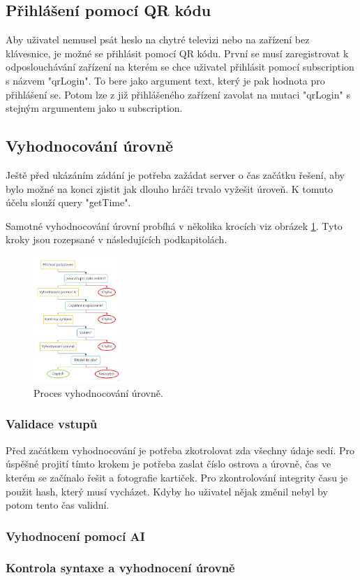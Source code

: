 \subsection{Přihlášení pomocí QR kódu}
Aby uživatel nemusel psát heslo na chytré televizi nebo na zařízení bez klávesnice, je možné se přihlásit pomocí QR kódu. První se musí zaregistrovat k odposlouchávání zařízení na kterém se chce uživatel přihlásit pomocí subscription s názvem "qrLogin". To bere jako argument text, který je pak hodnota pro přihlášení se. Potom lze z již přihlášeného zařízení zavolat na mutaci "qrLogin" s stejným argumentem jako u subscription.

\subsection{Vyhodnocování úrovně}
Ještě před ukázáním zádání je potřeba zažádat server o čas začátku řešení, aby bylo možné na konci zjistit jak dlouho hráči trvalo vyžešit úroveň. K tomuto účelu slouží query "getTime".\par
Samotné vyhodnocování úrovní probíhá v několika krocích viz obrázek \ref{fig:proces-vyhodnocovani}. Tyto kroky jsou rozepsané v následujících podkapitolách.

\begin{figure}[h]
    \centering
    \includegraphics[width=0.3\textwidth]{img/proces.jpg}
    \caption{Proces vyhodnocování úrovně.}
    \label{fig:proces-vyhodnocovani}
\end{figure}

\subsubsection{Validace vstupů}
Před začátkem vyhodnocování je potřeba zkotrolovat zda všechny údaje sedí. Pro úspěšné projití tímto krokem je potřeba zaslat číslo ostrova a úrovně, čas ve kterém se začínalo řešit a fotografie kartiček. Pro zkontrolování integrity času je použit hash, který musí vycházet. Kdyby ho uživatel nějak změnil nebyl by potom tento čas validní.

\subsubsection{Vyhodnocení pomocí AI}
\subsubsection{Kontrola syntaxe a vyhodnocení úrovně}